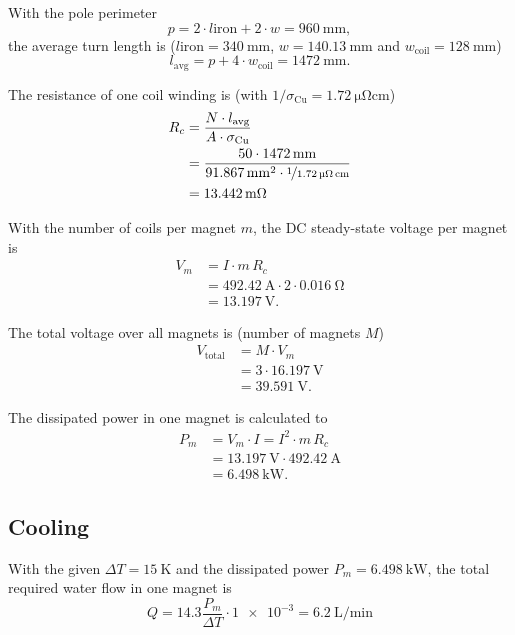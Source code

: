 \documentclass[10pt,a4paper,noendnumber=true]{scrartcl}
\begin{document}
With the pole perimeter
\begin{equation}
	p = 2 \cdot l\text{iron} + 2 \cdot w = \SI{960}{\mm},
\end{equation}
the average turn length is ($l\text{iron} = \SI{340}{\mm}$, $w = \SI{140.13}{\mm}$ and $w_\text{coil} = \SI{128}{\mm}$)
\begin{equation}
    l_\text{avg}= p + 4 \cdot w_\text{coil} = \SI{1472}{\mm}.
\end{equation}

The resistance of one coil winding is (with $1/\sigma_\text{Cu}=\SI{1.72}{\micro\ohm\cm}$)
\begin{align}
R_c&=\frac{N\cdot l_\text{avg}}{A\cdot\sigma_\text{Cu}} \\
&= \frac{50 \cdot \SI{1472}{\mm}}{\SI{91.867}{\mm\squared}\cdot \nicefrac{1}{\SI{1.72}{\micro\ohm\cm}}} \nonumber\\
&= \SI{13.442}{\milli\ohm} \nonumber
\end{align}

With the number of coils per magnet $m$, the DC steady-state voltage per magnet is
\begin{align}
V_m &= I \cdot m\,R_c \\
&= \SI{492.42}{\ampere} \cdot 2 \cdot \SI{0.016}{\ohm} \nonumber\\
&= \SI{13.197}{\volt}.\nonumber
\end{align}

The total voltage over all magnets is (number of magnets $M$)
\begin{align}
V_\text{total} &= M \cdot V_m \\
&= 3 \cdot \SI{16.197}{\volt} \nonumber\\
&= \SI{39.591}{\volt}.\nonumber
\end{align}

The dissipated power in one magnet is calculated to
\begin{align}
P_m &= V_m \cdot I = I^2 \cdot m\,R_c \\
&= \SI{13.197}{\volt} \cdot \SI{492.42}{\ampere} \nonumber\\
&= \SI{6.498}{\kilo\watt}.\nonumber
\end{align}

\subsection{Cooling}
With the given $\Delta T=\SI{15}{\kelvin}$ and the dissipated power $P_m=\SI{6.498}{\kilo\watt}$, the total required water flow in one magnet is
\begin{equation}
    Q = 14.3 \frac{P_m}{\Delta T} \cdot \num{1e-3} = \SI{6.2}{\liter\per\minute}
\end{equation}
\end{document}
